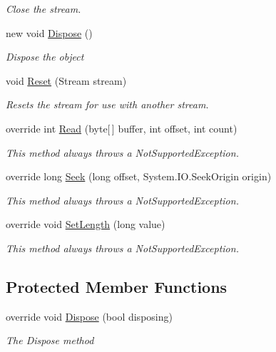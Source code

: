 \begin{DoxyCompactItemize}
\begin{DoxyCompactList}\small\item\em Close the stream. \end{DoxyCompactList}\item 
new void \mbox{\hyperlink{class_super_tiled2_unity_1_1_ionic_1_1_zlib_1_1_parallel_deflate_output_stream_a641dacebcb67562f7b384dfe5468f69b}{Dispose}} ()
\begin{DoxyCompactList}\small\item\em Dispose the object\end{DoxyCompactList}\item 
void \mbox{\hyperlink{class_super_tiled2_unity_1_1_ionic_1_1_zlib_1_1_parallel_deflate_output_stream_a876089be11e38c6842216cc2aefd3110}{Reset}} (Stream stream)
\begin{DoxyCompactList}\small\item\em Resets the stream for use with another stream. \end{DoxyCompactList}\item 
override int \mbox{\hyperlink{class_super_tiled2_unity_1_1_ionic_1_1_zlib_1_1_parallel_deflate_output_stream_ae7c4a06ce15004579b5b969a8c5d5db7}{Read}} (byte\mbox{[}$\,$\mbox{]} buffer, int offset, int count)
\begin{DoxyCompactList}\small\item\em This method always throws a Not\+Supported\+Exception. \end{DoxyCompactList}\item 
override long \mbox{\hyperlink{class_super_tiled2_unity_1_1_ionic_1_1_zlib_1_1_parallel_deflate_output_stream_ac0d0af55d367d6a7059507964ed6911d}{Seek}} (long offset, System.\+I\+O.\+Seek\+Origin origin)
\begin{DoxyCompactList}\small\item\em This method always throws a Not\+Supported\+Exception. \end{DoxyCompactList}\item 
override void \mbox{\hyperlink{class_super_tiled2_unity_1_1_ionic_1_1_zlib_1_1_parallel_deflate_output_stream_a2f6e56015d9048952802bf1a688c7467}{Set\+Length}} (long value)
\begin{DoxyCompactList}\small\item\em This method always throws a Not\+Supported\+Exception. \end{DoxyCompactList}\end{DoxyCompactItemize}
\subsection*{Protected Member Functions}
\begin{DoxyCompactItemize}
\item 
override void \mbox{\hyperlink{class_super_tiled2_unity_1_1_ionic_1_1_zlib_1_1_parallel_deflate_output_stream_a39a87bd93dc374bbd39308da9619da3b}{Dispose}} (bool disposing)
\begin{DoxyCompactList}\small\item\em The Dispose method\end{DoxyCompactList}\end{DoxyCompactItemize}

